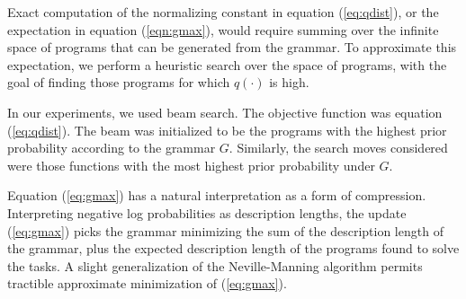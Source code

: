 \documentclass{article} %
\begin{document}
Exact computation of the normalizing constant in equation (\ref{eq:qdist}), or the expectation in equation (\ref{eqn:gmax}), would require summing over the infinite space of programs that can be generated from the grammar. To approximate this expectation, we perform a heuristic search over the space of programs, with the goal of finding those programs for which $q(\cdot)$ is high.

In our experiments, we used beam search. The objective function was equation (\ref{eq:qdist}).
The beam was initialized to be the programs with the highest prior probability according to the grammar $G$.
Similarly, the search moves considered were those functions with the most highest prior probability under $G$.

Equation (\ref{eq:gmax}) has a natural interpretation as a form of compression.
Interpreting negative log probabilities as description lengths, the update (\ref{eq:gmax}) picks the grammar minimizing the sum of the description length of the grammar, plus the expected description length of the programs found to solve the tasks.
A slight generalization of the Neville-Manning algorithm permits tractible approximate minimization of (\ref{eq:gmax}).

\end{document}
